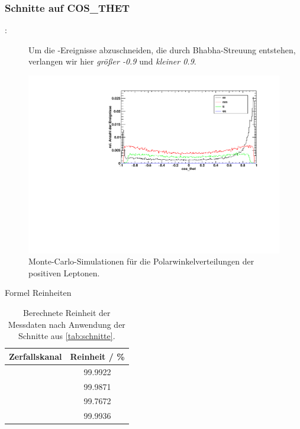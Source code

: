 \subsubsection*{Schnitte auf COS\_THET}
\begin{description}
\item[\Zee:] Um die \ee-Ereignisse abzuschneiden, die durch Bhabha-Streuung entstehen,
verlangen wir hier \emph{größer -0.9} und \emph{kleiner 0.9}.
\end{description}

\begin{figure}[H]
\begin{center}
  \includegraphics[width=\textwidth]{../img/dist_cos_thet.pdf}
 \caption{Monte-Carlo-Simulationen für die Polarwinkelverteilungen der positiven Leptonen.}
  \label{img:dist_cos_thet}
\end{center}
\end{figure} 

Formel Reinheiten
\begin{table}[H]
    \caption{Berechnete Reinheit der Messdaten nach Anwendung der Schnitte aus \autoref{tab:schnitte}.}
    \begin{center}
        \begin{tabular}{|c|c|}
            \hline
   Zerfallskanal   	& Reinheit / \%	\\ \hline
   \Zee				& 99.9922		\\ \hline
   \Zmm				& 99.9871		\\ \hline
   \Ztt				& 99.7672		\\ \hline
   \Zqq				& 99.9936		\\ \hline

        \end{tabular}
    \end{center}
    \label{tab:reinheiten}
\end{table}

